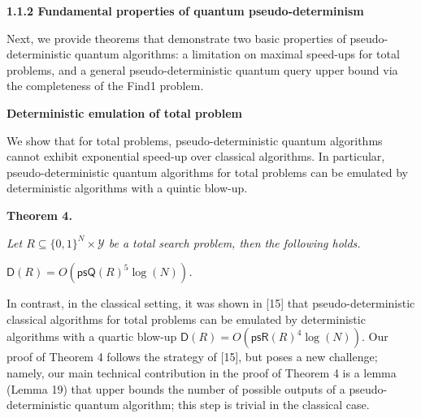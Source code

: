 \par\medskip\noindent\textbf{
1.1.2 Fundamental properties of quantum pseudo-determinism}\par




Next, we provide theorems that demonstrate two basic properties of pseudo-deterministic quantum algorithms: a limitation on maximal speed-ups for total problems, and a general pseudo-deterministic quantum query upper bound via the completeness of the Find1 problem.\par




\par\medskip\noindent\textbf{Deterministic emulation of total problem}\par




We show that for total problems, pseudo-deterministic quantum algorithms cannot exhibit exponential speed-up over classical algorithms. In particular, pseudo-deterministic quantum algorithms for total problems can be emulated by deterministic algorithms with a quintic blow-up.\par





\par\medskip\noindent\textbf{
\textbf{Theorem 4}\textbf{.}
}\par



\emph{Let ${R}\subseteq\{0,1\}^{N}\times\mathcal{Y}$ be a total search problem, then the following holds.}\par




$\mathsf{D}(R)=O(\mathsf{psQ}(R)^{5}\log(N))$\emph{.}\par






In contrast, in the classical setting, it was shown in [15] that pseudo-deterministic classical algorithms for total problems can be emulated by deterministic algorithms with a quartic blow-up $\mathsf{D}(R)=O(\mathsf{psR}(R)^{4}\log(N))$. Our proof of Theorem 4 follows the strategy of [15], but poses a new challenge; namely, our main technical contribution in the proof of Theorem 4 is a lemma (Lemma 19) that upper bounds the number of possible outputs of a pseudo-deterministic quantum algorithm; this step is trivial in the classical case.\par





